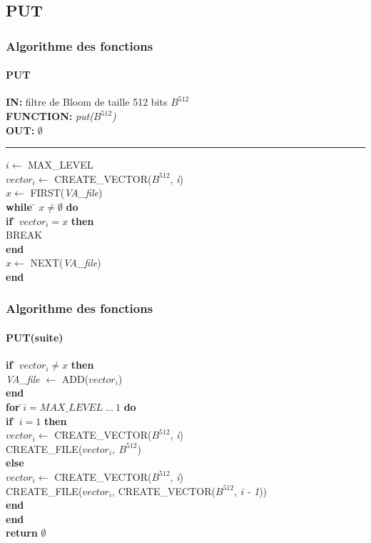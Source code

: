 \documentclass[hyperref={pdfpagemode=FullScreen,colorlinks=true},xcolor=pst,dvips]{beamer}\usepackage[french]{babel}
\begin{document}
	\subsection{PUT}
	\begin{frame}[shrink]
		\frametitle{Algorithme des fonctions}
		\framesubtitle{PUT}
		\begin{framed}
		\textbf{IN:} filtre de Bloom de taille 512 bits $B^{512}$\\
		\textbf{FUNCTION:} \textit{put($B^{512}$)}\\
		\textbf{OUT:} \textit{$\emptyset$}\\

		\noindent\rule{\linewidth}{0.5pt}

		\begin{tabbing}
			$i \leftarrow$ MAX\_LEVEL\\
			$vector_i \leftarrow$ CREATE\_VECTOR($B^{512}$, \textit{i})\\
			$x \leftarrow$ FIRST(\textit{VA\_file})\\
			\textbf{while }\= $x \neq \emptyset$ \textbf{do}\\
					\> \textbf{if }\= $vector_i = x$\textbf{ then}\\
					\> \> BREAK\\
					\> \textbf{end}\\
					\> $x \leftarrow$ NEXT(\textit{VA\_file})\\
			\textbf{end}	\\	
	    	\end{tabbing}		
	\end{framed}
	\end{frame}
	
	\begin{frame}[shrink]
		\frametitle{Algorithme des fonctions}
		\framesubtitle{PUT(suite)}
		\begin{framed}
		\begin{tabbing}
			\textbf{if }\= $vector_i \neq x$\textbf{ then}\\
				\> \textit{VA\_file } $\leftarrow$ ADD($vector_i$)\\
			\textbf{end}	\\	

			\textbf{for }\=$i = MAX\_LEVEL\ ...\ 1$ \textbf{do}\\
					\> \textbf{if }\= $i = 1$ \textbf{then}\\
					\> 	\> $vector_i \leftarrow$ CREATE\_VECTOR($B^{512}$, \textit{i})\\
					\>	\> CREATE\_FILE($vector_i,\ B^{512}$)\\
					\> \textbf{else}\\
					\>	\> $vector_i \leftarrow$ CREATE\_VECTOR($B^{512}$, \textit{i})\\
					\>	\> CREATE\_FILE($vector_i$, CREATE\_VECTOR($B^{512}$, \textit{i - 1}))\\
					\> \textbf{end}\\
			\textbf{end}	\\	
			\textbf{return} $\emptyset$\\
		\end{tabbing}
		\end{framed}
	\end{frame}
	
\end{document}

